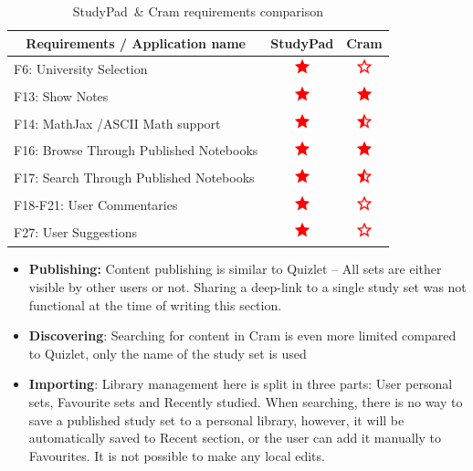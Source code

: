 \documentclass[thesis=B,english]{FITthesis}[2012/10/20]
\newcommand{\appname}{StudyPad}
\newcommand{\present}{\begin{minipage}{.1\textwidth}
\centering
      \includegraphics[width=15pt, height=15pt]{ic_star_black_24dp}
    \end{minipage}}
\newcommand{\limited}{\begin{minipage}{.1\textwidth}
\centering
      \includegraphics[width=15pt, height=15pt]{ic_star_half_black_24dp}
    \end{minipage}}
\newcommand{\absent}{\begin{minipage}{.1\textwidth}
\centering
      \includegraphics[width=15pt, height=15pt]{ic_star_border_black_24dp}
    \end{minipage}}
\begin{document}
\begin{table}[H]
\caption{\appname\ \& Cram requirements comparison}
\label{tab:cram}
\begin{tabular}{|l|c|c|}
\hline
\multicolumn{1}{|c|}{\textbf{Requirements / Application name}} & \multicolumn{1}{l|}{\textbf{StudyPad}} & \multicolumn{1}{l|}{\textbf{Cram}} \\ \hline
F6: University Selection                                       & \present                                & \absent                             \\ \hline
F13: Show Notes                                                & \present                                & \present                            \\ \hline
F14: MathJax /ASCII Math support                               & \present                                & \limited                            \\ \hline
F16: Browse Through Published Notebooks                        & \present                                & \present                            \\ \hline
F17: Search Through Published Notebooks                    & \present                                & \limited                            \\ \hline
F18-F21: User Commentaries                                     & \present                                & \absent                             \\ \hline
F27: User Suggestions                                          & \present                                & \absent                             \\ \hline
\end{tabular}
\end{table}

\begin{itemize}
	\item  \textbf{Publishing:} Content publishing is similar to Quizlet -- All sets are either visible by other users or not. Sharing a deep-link to a single study set was not functional at the time of writing this section.
	\item \textbf{Discovering}: Searching for content in Cram is even more limited compared to Quizlet, only the name of the study set is used
	\item \textbf{Importing}: Library management here is split in three parts: User personal sets, Favourite sets and Recently studied. When searching, there is no way to save a published study set to a personal library, however, it will be automatically saved to Recent section, or the user can add it manually to Favourites. It is not possible to make any local edits.
\end{itemize}
\end{document}
